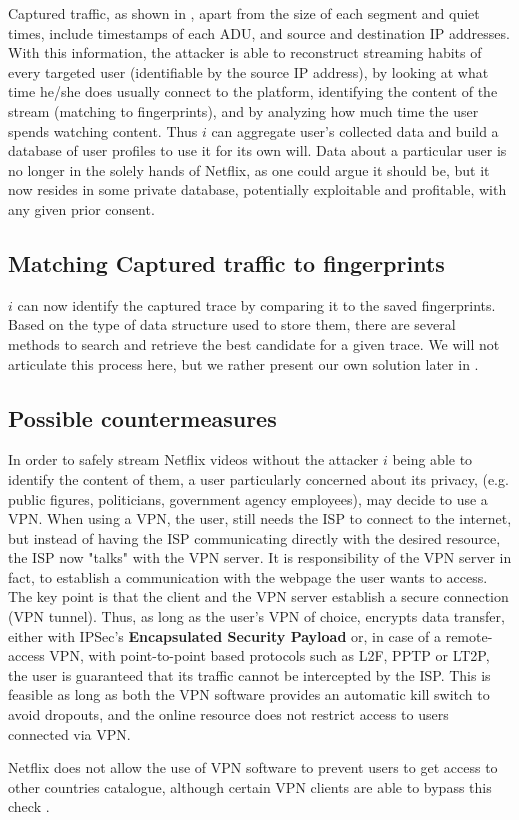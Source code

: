 Captured traffic, as shown in , apart from the size of each
segment and quiet times, include timestamps of each ADU, and source and
destination IP addresses. With this information, the attacker is able to
reconstruct streaming habits of every targeted user (identifiable by the source
IP address),  by looking at what time he/she does usually connect to the
platform, identifying the content of the stream (matching to fingerprints), and
by analyzing how much time the user spends watching content. Thus $i$ can
aggregate user's collected data and build a database of user profiles to use it
for its own will. Data about a particular user is no longer in the solely hands
of Netflix, as one could argue it should be, but it now resides in some private
database, potentially exploitable and profitable, with any given prior consent.

\subsection{Matching Captured traffic to fingerprints}

$i$ can now identify the captured trace by comparing it to the saved
fingerprints.  Based on the type of data structure used to store them, there
are several methods to search and retrieve the best candidate for a given
trace. We will not articulate this process here, but we rather present our own
solution later in .

\subsection{Possible countermeasures}\label{sec:vpn}

In order to safely stream Netflix videos without the attacker $i$ being able to
identify the content of them, a user particularly concerned about its privacy,
(e.g.  public figures, politicians, government agency employees), may decide to
use a VPN. When using a VPN, the user, still needs the ISP to connect to the
internet, but instead of having the ISP communicating directly with the desired
resource, the ISP now "talks" with the VPN server. It is responsibility of the
VPN server in fact, to establish a communication with the webpage the user
wants to access.  The key point is that the client and the VPN server establish
a secure connection (VPN tunnel). Thus, as long as the user's VPN of choice,
encrypts data transfer, either with IPSec's \textbf{Encapsulated Security
Payload} or, in case of a remote-access VPN, with point-to-point based
protocols such as L2F, PPTP or LT2P, the user is guaranteed that its traffic
cannot be intercepted by the ISP. This is feasible as long as both the VPN
software provides an automatic kill switch to avoid dropouts, and the online
resource does not restrict access to users connected via VPN. 

Netflix does not allow the use of VPN software to prevent users to get access
to other countries catalogue, although certain VPN clients are able to bypass
this check \cite{nordvpn}.
